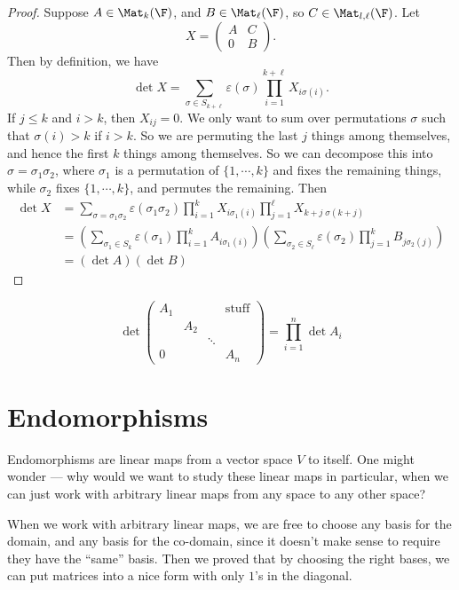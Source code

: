 \documentclass[a4paper]{article}
\begin{document}
\begin{proof}
  Suppose $A\in \Mat_k(\F)$, and $B\in \Mat_{\ell}(\F)$, so $C \in \Mat_{l, \ell}(\F)$. Let
  \[
    X =
    \begin{pmatrix}
      A & C\\
      0 & B
    \end{pmatrix}.
  \]
  Then by definition, we have
  \[
    \det X = \sum_{\sigma \in S_{k + \ell}}\varepsilon(\sigma) \prod_{i = 1}^{k + \ell} X_{i\sigma(i)}.
  \]
  If $j \leq k$ and $i > k$, then $X_{ij} = 0$. We only want to sum over permutations $\sigma$ such that $\sigma(i) > k$ if $i > k$. So we are permuting the last $j$ things among themselves, and hence the first $k$ things among themselves. So we can decompose this into $\sigma = \sigma_1 \sigma_2$, where $\sigma_1$ is a permutation of $\{1, \cdots, k\}$ and fixes the remaining things, while $\sigma_2$ fixes $\{1, \cdots, k\}$, and permutes the remaining. Then
  \begin{align*}
    \det X &= \sum_{\sigma = \sigma_1\sigma_2}\varepsilon(\sigma_1\sigma_2) \prod_{i = 1}^k X_{i\sigma_1(i)} \prod_{j = 1}^\ell X_{k + j\; \sigma(k + j)}\\
    &= \left(\sum_{\sigma_1 \in S_k} \varepsilon(\sigma_1) \prod_{i = 1}^k A_{i\sigma_1(i)}\right)\left(\sum_{\sigma_2 \in S_\ell} \varepsilon(\sigma_2) \prod_{j = 1}^k B_{j\sigma_2(j)}\right)\\
    &= (\det A)(\det B)
  \end{align*}
\end{proof}

\begin{cor}
  \[
    \det
    \begin{pmatrix}
      A_1 & & & \mathrm{stuff}\\
      & A_2\\
      & & \ddots\\
      0 & & & A_n
    \end{pmatrix} = \prod_{i = 1}^n \det A_i
  \]
\end{cor}

\section{Endomorphisms}
Endomorphisms are linear maps from a vector space $V$ to itself. One might wonder --- why would we want to study these linear maps in particular, when we can just work with arbitrary linear maps from any space to any other space?

When we work with arbitrary linear maps, we are free to choose any basis for the domain, and any basis for the co-domain, since it doesn't make sense to require they have the ``same'' basis. Then we proved that by choosing the right bases, we can put matrices into a nice form with only $1$'s in the diagonal.
\end{document}
